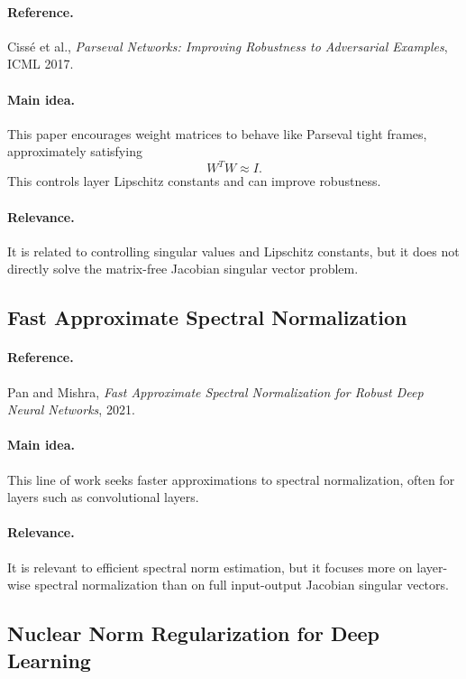 \documentclass{article}
\begin{document}
\paragraph{Reference.}
Ciss\'e et al., \emph{Parseval Networks: Improving Robustness to Adversarial Examples}, ICML 2017.

\paragraph{Main idea.}
This paper encourages weight matrices to behave like Parseval tight frames, approximately satisfying
\[
W^TW\approx I.
\]
This controls layer Lipschitz constants and can improve robustness.

\paragraph{Relevance.}
It is related to controlling singular values and Lipschitz constants, but it does not directly solve the matrix-free Jacobian singular vector problem.

\subsection{Fast Approximate Spectral Normalization}

\paragraph{Reference.}
Pan and Mishra, \emph{Fast Approximate Spectral Normalization for Robust Deep Neural Networks}, 2021.

\paragraph{Main idea.}
This line of work seeks faster approximations to spectral normalization, often for layers such as convolutional layers.

\paragraph{Relevance.}
It is relevant to efficient spectral norm estimation, but it focuses more on layer-wise spectral normalization than on full input-output Jacobian singular vectors.

\subsection{Nuclear Norm Regularization for Deep Learning}
\end{document}
